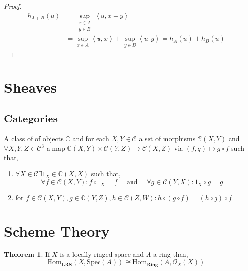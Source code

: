 \documentclass[12pt]{extarticle}
\newcommand{\C}{\mathbb{C}}
\theoremstyle{definition}
\newtheorem{theorem}{Theorem}[section]
\newenvironment{definition}[1][Definition:]{\begin{trivlist}
\item[\hskip \labelsep {\bfseries #1}]}{\end{trivlist}}
\newcommand{\inner}[2]{\left< #1, #2 \right>}
\begin{document}
\begin{proof}
\begin{align*}
h_{A + B}(u) & = \sup_{\substack{x \in A \\ y \in B}} \inner{u}{x + y}
\\
& = \sup_{x \in A} \inner{u}{x} + \sup_{y \in B} \inner{u}{y}  = h_A(u) + h_B(u) 
\end{align*}
\end{proof}

\section{Sheaves}

\subsection{Categories}

\newcommand{\Cat}{\mathcal{C}}

\begin{definition}
A class of of objects $\C$ and for each $X, Y \in \Cat$ a set of morphisms $\Cat(X, Y)$ and $\forall X, Y, Z \in \Cat^3$ a map $\C(X, Y) \times \Cat(Y, Z) \to \Cat(X, Z)$ via $(f, g) \mapsto g \circ f$ such that,
\begin{enumerate}
\item $\forall X \in \Cat \exists 1_X \in \C(X, X)$ such that,
\[ \forall f \in \Cat(X, Y) : f \circ 1_X = f \quad \text{  and  } \quad \forall g \in \Cat(Y, X) : 1_X \circ g = g \]
\item for $f \in \Cat(X, Y), g \in \C(Y, Z), h \in \Cat(Z, W) : h \circ (g \circ f) = (h \circ g) \circ f$
\end{enumerate}
\end{definition}

\section{Scheme Theory}

\newcommand{\LRS}{\mathbf{LRS}}
\newcommand{\Ring}{\mathbf{Ring}}
\newcommand{\Ab}{\mathbf{Ab}}
\newcommand{\Homover}[3]{\mathrm{Hom}_{#1}\left( #2, #3 \right)}
\newcommand{\Spec}[1]{\mathrm{Spec}\left( #1 \right)}
\newcommand{\struct}[1]{\mathcal{O}_{#1}}
\newcommand{\stalk}[2]{\mathcal{O}_{#1, #2}}
\newcommand{\Sf}{\mathfrak{S}}
\newcommand{\Rg}{\mathrm{Rg}}
\newcommand{\op}{\mathrm{op}}
\newcommand{\Sch}{\mathbf{Sch}}
\newcommand{\Alg}{\mathbf{Alg}}

\begin{theorem}
If $X$ is a locally ringed space and $A$ a ring then,
\[ \Homover{\mathbf{LRS}}{X}{\Spec{A}} \cong \Homover{\mathbf{Ring}}{A}{\struct{X}(X)} \]
\end{theorem}
\end{document}
